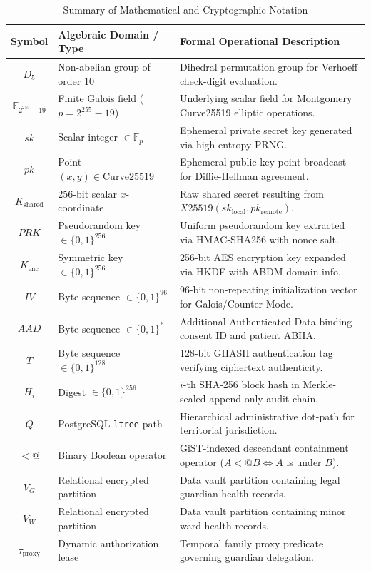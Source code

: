 \documentclass[journal,twocolumn]{IEEEtran}
\begin{document}
\begin{table}[t]
\caption{Summary of Mathematical and Cryptographic Notation}
\label{tab:notation}
\centering
\small
\begin{tabularx}{\columnwidth}{clX}
\toprule

\textbf{Symbol} & \textbf{Algebraic Domain / Type} & \textbf{Formal Operational Description} \\
\midrule
$D_5$ & Non-abelian group of order 10 & Dihedral permutation group for Verhoeff check-digit evaluation. \\
$\mathbb{F}_{2^{255}-19}$ & Finite Galois field ($p = 2^{255}-19$) & Underlying scalar field for Montgomery Curve25519 elliptic operations. \\
$sk$ & Scalar integer $\in \mathbb{F}_p$ & Ephemeral private secret key generated via high-entropy PRNG. \\
$pk$ & Point $(x, y) \in \text{Curve25519}$ & Ephemeral public key point broadcast for Diffie-Hellman agreement. \\
$K_{\text{shared}}$ & 256-bit scalar $x$-coordinate & Raw shared secret resulting from $X25519(sk_{\text{local}}, pk_{\text{remote}})$. \\
$PRK$ & Pseudorandom key $\in \{0,1\}^{256}$ & Uniform pseudorandom key extracted via HMAC-SHA256 with nonce salt. \\
$K_{\text{enc}}$ & Symmetric key $\in \{0,1\}^{256}$ & 256-bit AES encryption key expanded via HKDF with ABDM domain info. \\
$IV$ & Byte sequence $\in \{0,1\}^{96}$ & 96-bit non-repeating initialization vector for Galois/Counter Mode. \\
$AAD$ & Byte sequence $\in \{0,1\}^*$ & Additional Authenticated Data binding consent ID and patient ABHA. \\
$T$ & Byte sequence $\in \{0,1\}^{128}$ & 128-bit GHASH authentication tag verifying ciphertext authenticity. \\
$H_i$ & Digest $\in \{0,1\}^{256}$ & $i$-th SHA-256 block hash in Merkle-sealed append-only audit chain. \\
$Q$ & PostgreSQL \texttt{ltree} path & Hierarchical administrative dot-path for territorial jurisdiction. \\
$<@$ & Binary Boolean operator & GiST-indexed descendant containment operator ($A <@ B \iff A$ is under $B$). \\
$V_G$ & Relational encrypted partition & Data vault partition containing legal guardian health records. \\
$V_W$ & Relational encrypted partition & Data vault partition containing minor ward health records. \\
$\tau_{\text{proxy}}$ & Dynamic authorization lease & Temporal family proxy predicate governing guardian delegation. \\
\bottomrule
\end{tabularx}
\end{table}
\end{document}
